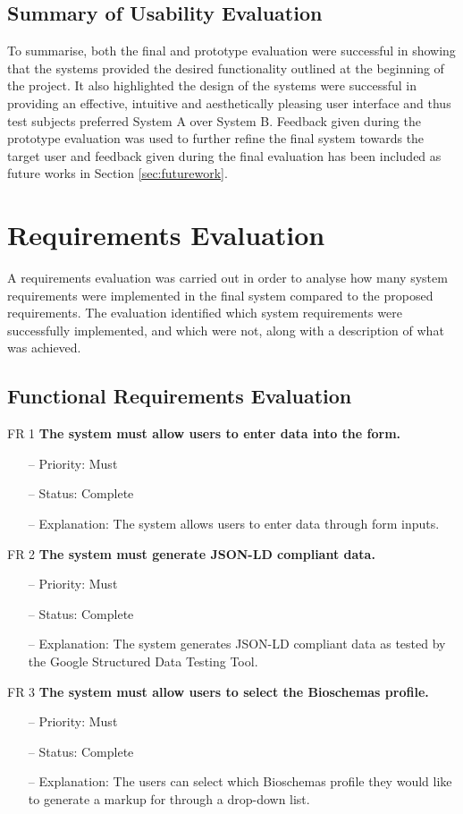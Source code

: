 \subsection{Summary of Usability Evaluation}
To summarise, both the final and prototype evaluation were successful in showing that the systems provided the desired functionality outlined at the beginning of the project. It also highlighted the design of the systems were successful in providing an effective, intuitive and aesthetically pleasing user interface and thus test subjects preferred System A over System B. Feedback given during the prototype evaluation was used to further refine the final system towards the target user and feedback given during the final evaluation has been included as future works in Section \ref{sec:futurework}.


\newpage
\section{Requirements Evaluation}
A requirements evaluation was carried out in order to analyse how many system requirements were implemented in the final system compared to the proposed requirements. The evaluation identified which system requirements were successfully implemented, and which were not, along with a description of what was achieved. 
\subsection{Functional Requirements Evaluation}

FR 1 \textbf{The system must allow users to enter data into the form.}
\begin{itemize}
\item[--] Priority: Must
\item[--] Status: Complete
\item[--] Explanation: The system allows users to enter data through form inputs.
\end{itemize}

\noindent
FR 2 \textbf{The system must generate JSON-LD compliant data.}
\begin{itemize}
\item[--] Priority: Must
\item[--] Status: Complete
\item[--] Explanation: The system generates JSON-LD compliant data as tested by the Google Structured Data Testing Tool.
\end{itemize}
\noindent
FR 3 \textbf{The system must allow users to select the Bioschemas profile.}
\begin{itemize}
\item[--] Priority: Must
\item[--] Status: Complete
\item[--] Explanation: The users can select which Bioschemas profile they would like to generate a markup for through a drop-down list.
\end{itemize}

